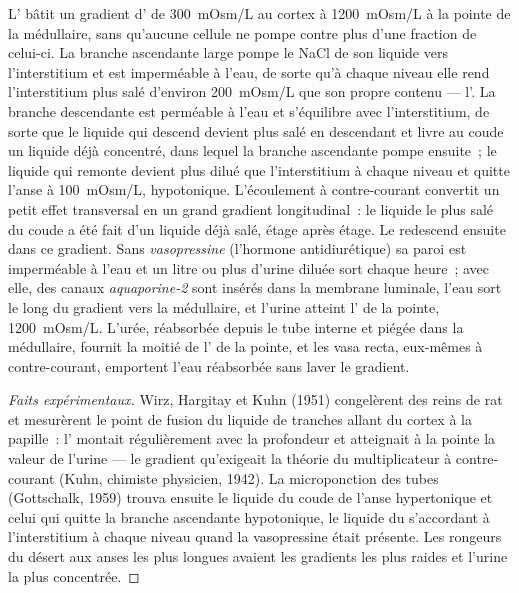 \begin{proposition}\label{prop:b3:renal-osmoregulation:countercurrent}
L' bâtit un gradient d' de \qty{300}{mOsm/L} au
cortex à \qty{1200}{mOsm/L} à la pointe de la médullaire, sans qu'aucune
cellule ne pompe contre plus d'une fraction de celui-ci. La branche
ascendante large pompe le NaCl de son liquide vers l'interstitium et est
imperméable à l'eau, de sorte qu'à chaque niveau elle rend
l'interstitium plus salé d'environ \qty{200}{mOsm/L} que son propre
contenu --- l'\emph{}. La branche descendante est
perméable à l'eau et s'équilibre avec l'interstitium, de sorte que le
liquide qui descend devient plus salé en descendant et livre au coude un
liquide déjà concentré, dans lequel la branche ascendante pompe ensuite~;
le liquide qui remonte devient plus dilué que l'interstitium à chaque
niveau et quitte l'anse à \qty{100}{mOsm/L}, hypotonique. L'écoulement à
contre-courant convertit un petit effet transversal en un grand gradient
longitudinal~: le liquide le plus salé du coude a été fait d'un liquide
déjà salé, étage après étage. Le  redescend ensuite dans
ce gradient. Sans \emph{vasopressine} (l'hormone antidiurétique) sa
paroi est imperméable à l'eau et un litre ou plus d'urine diluée sort
chaque heure~; avec elle, des canaux \emph{aquaporine-2} sont insérés
dans la membrane luminale, l'eau sort le long du gradient vers la
médullaire, et l'urine atteint l' de la pointe,
\qty{1200}{mOsm/L}. L'urée, réabsorbée depuis le tube interne et piégée
dans la médullaire, fournit la moitié de l' de la pointe, et
les vasa recta, eux-mêmes à contre-courant, emportent l'eau réabsorbée
sans laver le gradient.
\end{proposition}

\begin{proof}[Faits expérimentaux]
Wirz, Hargitay et Kuhn (1951) congelèrent des reins de rat et mesurèrent
le point de fusion du liquide de tranches allant du cortex à la
papille~: l' montait régulièrement avec la profondeur et
atteignait à la pointe la valeur de l'urine --- le gradient qu'exigeait
la théorie du multiplicateur à contre-courant (Kuhn, chimiste physicien,
1942). La microponction des tubes (Gottschalk, 1959) trouva ensuite le
liquide du coude de l'anse hypertonique et celui qui quitte la branche
ascendante hypotonique, le liquide du  s'accordant à
l'interstitium à chaque niveau quand la vasopressine était présente. Les
rongeurs du désert aux anses les plus longues avaient les gradients les
plus raides et l'urine la plus concentrée.
\end{proof}

